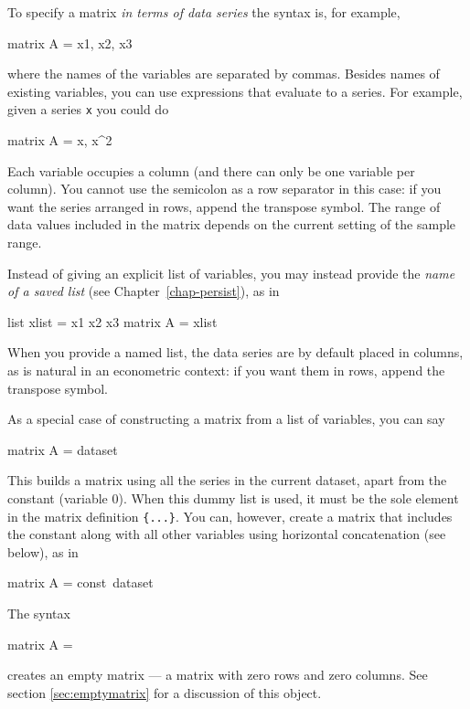 To specify a matrix \textit{in terms of data series} the syntax is,
for example,
%
\begin{code}
matrix A = { x1, x2, x3 }
\end{code}
%
where the names of the variables are separated by commas.  Besides
names of existing variables, you can use expressions that evaluate to
a series.  For example, given a series \texttt{x} you could do
%
\begin{code}
matrix A = { x, x^2 }
\end{code}
%
Each variable occupies a column (and there can only be one variable
per column).  You cannot use the semicolon as a row separator in this
case: if you want the series arranged in rows, append the transpose
symbol.  The range of data values included in the matrix depends on
the current setting of the sample range.


Instead of giving an explicit list of variables, you may instead
provide the \textit{name of a saved list} (see
Chapter~\ref{chap-persist}), as in
%
\begin{code}
list xlist = x1 x2 x3
matrix A = { xlist }
\end{code}
%
When you provide a named list, the data series are by default placed
in columns, as is natural in an econometric context: if you want them
in rows, append the transpose symbol.

As a special case of constructing a matrix from a list of variables,
you can say
%
\begin{code}
matrix A = { dataset }
\end{code}
%
This builds a matrix using all the series in the current dataset,
apart from the constant (variable 0).  When this dummy list is used, it
must be the sole element in the matrix definition \texttt{\{...\}}.  You
can, however, create a matrix that includes the constant along with
all other variables using horizontal concatenation (see below), as in
%
\begin{code}
matrix A = {const}~{dataset}
\end{code}
%

The syntax 
%
\begin{code}
matrix A = {}
\end{code}
%
creates an empty matrix --- a matrix with zero rows and zero columns.
See section \ref{sec:emptymatrix} for a discussion of this
object.

